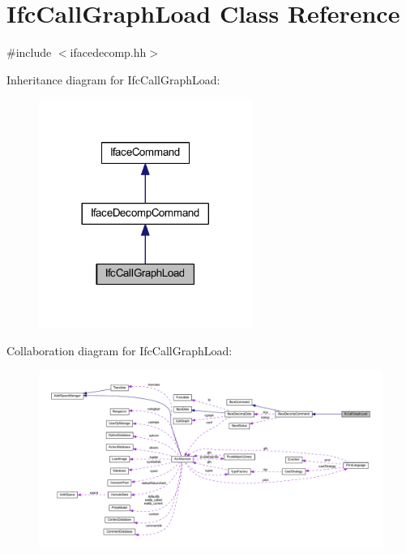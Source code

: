 \hypertarget{class_ifc_call_graph_load}{}\section{Ifc\+Call\+Graph\+Load Class Reference}
\label{class_ifc_call_graph_load}


{\ttfamily \#include $<$ifacedecomp.\+hh$>$}



Inheritance diagram for Ifc\+Call\+Graph\+Load\+:
\nopagebreak
\begin{figure}[H]
\begin{center}
\leavevmode
\includegraphics[width=197pt]{class_ifc_call_graph_load__inherit__graph}
\end{center}
\end{figure}


Collaboration diagram for Ifc\+Call\+Graph\+Load\+:
\nopagebreak
\begin{figure}[H]
\begin{center}
\leavevmode
\includegraphics[width=350pt]{class_ifc_call_graph_load__coll__graph}
\end{center}
\end{figure}
